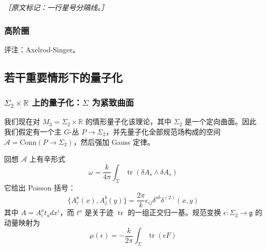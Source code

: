 {\small\itshape ［原文标记：一行星号分隔线。］}

\subsubsection{高阶圈} %

评注：Axelrod-Singer。

\subsection{若干重要情形下的量子化} %

\subsubsection{\texorpdfstring{$\Sigma_2\times\mathbb{R}$}{Σ2×R} 上的量子化：\texorpdfstring{$\Sigma$}{Σ} 为紧致曲面} %

我们现在对 $M_3=\Sigma_2\times\mathbb{R}$ 的情形量子化该理论，其中 $\Sigma_2$ 是一个定向曲面。因此我们假定有一个主 $G$-丛 $P\to\Sigma_2$，并先量子化全部规范场构成的空间 $\mathcal{A}=\mathrm{Conn}(P\to\Sigma_2)$，然后强加 Gauss 定律。

回想 $\mathcal{A}$ 上有辛形式
\begin{equation}
  \omega=\frac{k}{4\pi}\int_{\Sigma}\operatorname{tr}\left(\delta A_{s}\wedge\delta A_{s}\right)
  \tag{3.37}
  \label{eq:3.37}
\end{equation}
它给出 Poisson 括号：
\begin{equation}
  \{A^{a}_{i}(x),A^{b}_{j}(y)\}=\frac{2\pi}{k}\epsilon_{ij}\delta^{ab}\delta^{(2)}(x,y)
  \tag{3.38}
  \label{eq:3.38}
\end{equation}
其中 $A=A^{a}_{i}t_{a}dx^{i}$，而 $t^{a}$ 是关于迹 $\operatorname{tr}$ 的一组正交归一基。规范变换 $\epsilon:\Sigma_2\to\mathfrak{g}$ 的动量映射为
\begin{equation}
  \mu(\epsilon)=-\frac{k}{2\pi}\int_{\Sigma}\operatorname{tr}\left(\epsilon F\right)
  \tag{3.39}
  \label{eq:3.39}
\end{equation}

